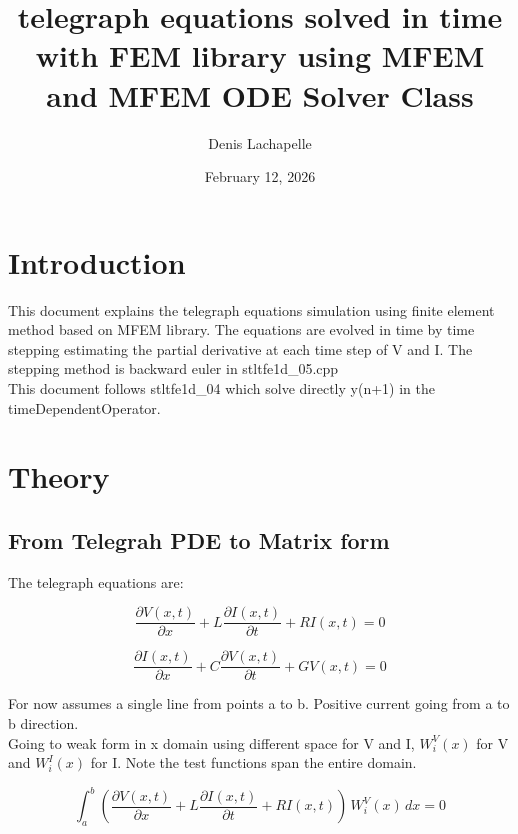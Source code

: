 \documentclass[12pt, letterpaper]{article}
\title{telegraph equations solved in time with FEM library using MFEM and MFEM ODE Solver Class}
\author{Denis Lachapelle}
\date{February 12, 2026}
\begin{document}
	
\maketitle

\tableofcontents

\section{Introduction}
This document explains the telegraph equations simulation using finite element method based on MFEM library. The equations are evolved in time by time stepping estimating the partial derivative at each time step of V and I. The stepping method is backward euler in stltfe1d\_05.cpp\\

This document follows stltfe1d\_04 which solve directly y(n+1) in the timeDependentOperator.

\section{Theory}

\subsection{From Telegrah PDE to Matrix form}

The telegraph equations are:

  \begin{equation}\frac{\partial{V(x,t)}}{\partial{x}} + L \frac{\partial{I(x,t)}}{\partial{t}} + R I(x,t) = 0\end{equation}


\begin{equation}\frac{\partial{I(x,t)}}{\partial{x}} + C \frac{\partial{V(x,t)}}{\partial{t}} + G V(x,t) = 0\end{equation}

For now assumes a single line from points a to b. Positive current going from a to b direction.\\

Going to weak form in x domain using different space for V and I, $W^V_i(x)$ for V and $W^I_i(x)$ for I. Note the test functions span the entire domain.

\begin{equation}\int_a^b(\frac{\partial{V(x,t)}}{\partial{x}} + L \frac{\partial{I(x,t)}}{\partial{t}} + R I(x,t))\, W^V_i(x)\, dx = 0\end{equation}
\end{document}
